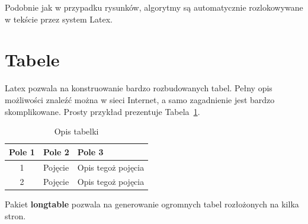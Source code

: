 \documentclass[twoside,a4paper]{book}
\begin{document}
Podobnie jak w przypadku rysunków, algorytmy są automatycznie rozlokowywane w tekście przez system Latex.

\section{Tabele}

Latex pozwala na konstruowanie bardzo rozbudowanych tabel. Pełny opis możliwości znaleźć można w sieci Internet, a samo zagadnienie jest bardzo skomplikowane. Prosty przykład prezentuje Tabela~\ref{tab:tab1}.

\begin{table}[h]
\caption{Opis tabelki}
\label{tab:tab1}
 \centering
\begin{tabular}{|c|p{4.5cm}|p{6cm}|}
  \hline
  Pole 1 & Pole 2 & Pole 3\\
  \hline
  1 & Pojęcie & Opis tegoż pojęcia\\
  \hline
  2 & Pojęcie & Opis tegoż pojęcia\\
  \hline
\end{tabular}
\end{table}

Pakiet \textbf{longtable} pozwala na generowanie ogromnych tabel rozłożonych na kilka stron.
\end{document}
